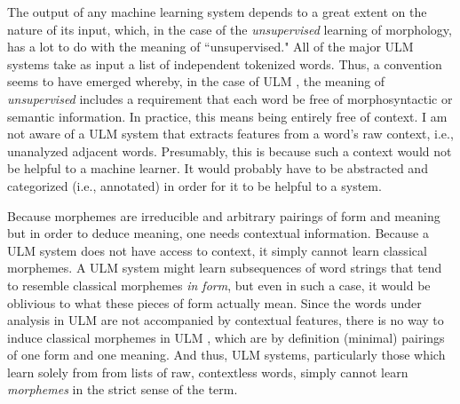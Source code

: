 The output of any machine learning system depends to 
a great extent on the nature of its input, which, in the case of the \emph{unsupervised} learning of morphology, 
has a lot to do with the meaning of ``unsupervised." 
All of the major \ac{ULM}  
systems take as input a list of independent tokenized words. 
Thus, a convention seems to have emerged whereby, in the 
case of \ac{ULM} , the meaning of \emph{unsupervised} includes a
requirement that each word be free of morphosyntactic 
or semantic information. In practice,
this means being entirely free of context. I am 
not aware of a \ac{ULM}  system that extracts features from a word's raw context, i.e.,
unanalyzed adjacent words. Presumably, this is because 
such a context would not be helpful to a machine learner. 
It would probably have to be abstracted and categorized 
(i.e., annotated) in order
for it to be helpful to a system. 

Because morphemes are irreducible and arbitrary pairings of form and meaning
but in order to deduce meaning, one needs contextual information. Because
a \ac{ULM}  system does not have access to context, it simply cannot learn classical morphemes.
A \ac{ULM}  system might learn subsequences of word strings that tend to resemble
 classical morphemes \emph{in form}, but even in such a case, it would be oblivious to what
 these pieces of form actually mean. 
Since the words under analysis in \ac{ULM} are not accompanied by contextual features,
there is no way to induce classical morphemes in \ac{ULM} ,
which are by definition (minimal) pairings of one form and one 
meaning.
And thus, \ac{ULM}  systems, particularly those which learn solely from 
from lists of raw, contextless words, simply cannot learn 
\emph{morphemes} in the strict sense of the term.

